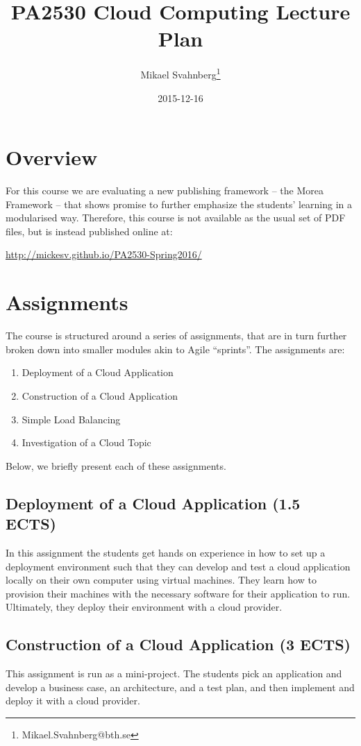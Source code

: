 \documentclass[11pt]{article}
\author{Mikael Svahnberg\thanks{Mikael.Svahnberg@bth.se}}
\date{2015-12-16}
\title{PA2530 Cloud Computing Lecture Plan}
\begin{document}
\maketitle
\tableofcontents



\section{Overview}
\label{sec-1}
For this course we are evaluating a new publishing framework -- the Morea Framework -- that shows promise to further emphasize the students' learning in a modularised way. Therefore, this course is not available as the usual set of PDF files, but is instead published online at:

\url{http://mickesv.github.io/PA2530-Spring2016/}

\section{Assignments}
\label{sec-2}
The course is structured around a series of assignments, that are in turn further broken down into smaller modules akin to Agile ``sprints''. The assignments are:

\begin{enumerate}
\item Deployment of a Cloud Application
\item Construction of a Cloud Application
\item Simple Load Balancing
\item Investigation of a Cloud Topic
\end{enumerate}

Below, we briefly present each of these assignments.

\subsection{Deployment of a Cloud Application (1.5 ECTS)}
\label{sec-2-1}
In this assignment the students get hands on experience in how to set up a deployment environment such that they can develop and test a cloud application locally on their own computer using virtual machines. They learn how to provision their machines with the necessary software for their application to run. Ultimately, they deploy their environment with a cloud provider.
\subsection{Construction of a Cloud Application (3 ECTS)}
\label{sec-2-2}
This assignment is run as a mini-project. The students pick an application and develop a business case, an architecture, and a test plan, and then implement and deploy it with a cloud provider.
\end{document}
